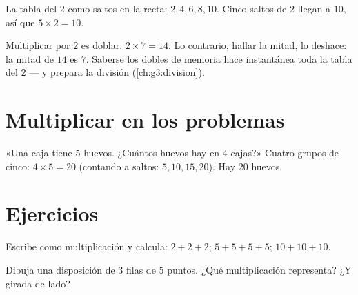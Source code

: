 \begin{omfigure}

{\small La tabla del $2$ como saltos en la recta: $2, 4, 6, 8, 10$. Cinco
saltos de $2$ llegan a $10$, así que $5 \times 2 = 10$.}
\end{omfigure}

\begin{example}\label{ex:g2:mult:double}
Multiplicar por $2$ es doblar: $2 \times 7 = 14$. Lo contrario,
hallar la mitad, lo deshace: la mitad de $14$ es $7$. Saberse los dobles de
memoria hace instantánea toda la tabla del $2$ --- y prepara la división
(\cref{ch:g3:division}).
\end{example}

\section{Multiplicar en los problemas}

\begin{example}\label{ex:g2:mult:problem}
«Una caja tiene $5$ huevos. ¿Cuántos huevos hay en $4$ cajas?» Cuatro grupos de
cinco: $4 \times 5 = 20$ (contando a saltos: $5, 10, 15, 20$). Hay
$20$ huevos.
\end{example}

\section{Ejercicios}

\begin{exercise}[$\star$]\label{exo:g2:mult:1}
Escribe como multiplicación y calcula: $2 + 2 + 2$; \quad
$5 + 5 + 5 + 5$; \quad $10 + 10 + 10$.
\end{exercise}

\begin{exercise}[$\star$]\label{exo:g2:mult:2}
Dibuja una disposición de $3$ filas de $5$ puntos. ¿Qué multiplicación
representa? ¿Y girada de lado?
\end{exercise}

